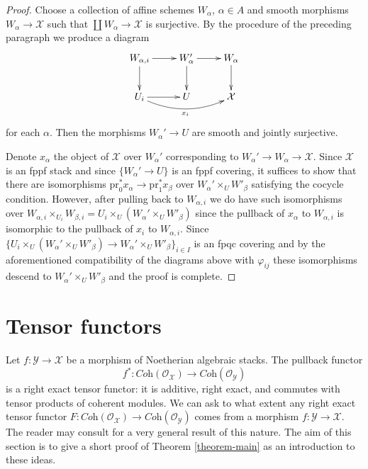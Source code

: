 \begin{proof}
\medskip\noindent
Choose a collection of affine schemes $W_\alpha$, $\alpha \in A$
and smooth morphisms $W_\alpha \to \mathcal{X}$ such that
$\coprod W_\alpha \to \mathcal{X}$ is surjective.
By the procedure of the preceding paragraph we produce
a diagram
$$
\xymatrix{
W_{\alpha, i} \ar[d] \ar[r] &
W_\alpha' \ar[d] \ar[r] &
W_\alpha \ar[d] \\
U_i \ar[r] \ar@/_1pc/[rr]_{x_i} &
U &
\mathcal{X}
}
$$
for each $\alpha$. Then the morphisms $W_\alpha' \to U$ are
smooth and jointly surjective.

\medskip\noindent
Denote $x_\alpha$ the object of $\mathcal{X}$ over $W_\alpha'$
corresponding to $W_\alpha' \to W_\alpha \to \mathcal{X}$.
Since $\mathcal{X}$ is an fppf stack and since
$\{W_\alpha' \to U\}$ is an fppf covering, it suffices
to show that there are isomorphisms
$\text{pr}_0^*x_\alpha \to \text{pr}_1^*x_\beta$
over $W_\alpha' \times_U W'_\beta$ satisfying the
cocycle condition. However, after pulling back to
$W_{\alpha, i}$ we do have such isomorphisms over
$W_{\alpha, i} \times_{U_i} W_{\beta, i} =
U_i \times_U (W_\alpha' \times_U W'_\beta)$
since the pullback of $x_\alpha$ to $W_{\alpha, i}$
is isomorphic to the pullback of $x_i$ to $W_{\alpha, i}$.
Since $\{U_i \times_U (W_\alpha' \times_U W'_\beta) \to
W_\alpha' \times_U W'_\beta\}_{i \in I}$
is an fpqc covering and by the aforementioned compatibility
of the diagrams above with $\varphi_{ij}$ these
isomorphisms descend to $W_\alpha' \times_U W'_\beta$
and the proof is complete.
\end{proof}










\section{Tensor functors}
\label{section-tensor-functors}

\noindent
Let $f : \mathcal{Y} \to \mathcal{X}$ be a morphism of Noetherian
algebraic stacks. The pullback functor
$$
f^* :
\textit{Coh}(\mathcal{O}_\mathcal{X})
\longrightarrow
\textit{Coh}(\mathcal{O}_\mathcal{Y})
$$
is a right exact tensor functor: it is additive, right exact,
and commutes with tensor products of coherent modules. We can
ask to what extent any right exact tensor functor
$F : \textit{Coh}(\mathcal{O}_\mathcal{X}) \to
\textit{Coh}(\mathcal{O}_\mathcal{Y})$ comes from a
morphism $f : \mathcal{Y} \to \mathcal{X}$.
The reader may consult
\cite{Hall-Rydh-coherent} for a very general result
of this nature.
The aim of this section is to give a short proof of
Theorem \ref{theorem-main} as an introduction to these ideas.

